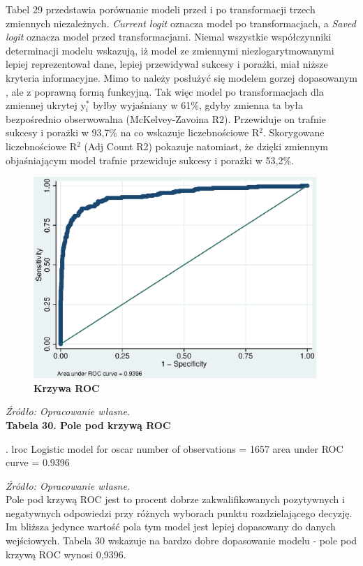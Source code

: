 Tabel 29 przedstawia porównanie modeli przed i po transformacji trzech zmiennych niezależnych. \textit{Current logit} oznacza model po transformacjach, a \textit{Saved logit} oznacza model przed transformacjami. Niemal wszystkie współczynniki determinacji modelu wskazują, iż model ze zmiennymi niezlogarytmowanymi lepiej reprezentował dane, lepiej przewidywał sukcesy i porażki, miał niższe kryteria informacyjne. Mimo to należy posłużyć się modelem gorzej dopasowanym , ale z poprawną formą funkcyjną. Tak więc model po transformacjach dla zmiennej ukrytej y$_{i}^{*}$ byłby wyjaśniany w 61\%, gdyby zmienna ta była bezpośrednio obserwowalna (McKelvey-Zavoina R2). Przewiduje on trafnie sukcesy i porażki w 93,7\% na co wskazuje liczebnościowe R$^{2}$. Skorygowane liczebnościowe R$^{2}$ (Adj Count R2) pokazuje natomiast, że dzięki zmiennym objaśniającym model trafnie przewiduje sukcesy i porażki w 53,2\%.

\begin{figure}[h]
\begin{centering}
  \includegraphics[height=3in]{Rysunki//ROC2}
    \caption{\textbf{Krzywa ROC}}
\end{centering}
\end{figure}
\textit{\footnotesize{Źródło: Opracowanie własne.}} \\

\vspace{0.5cm}
\textbf{Tabela 30. Pole pod krzywą ROC }
\begin{stlog}
. lroc
{\smallskip}
Logistic model for oscar
{\smallskip}
number of observations =     1657
area under ROC curve   =   0.9396 
 \end{stlog}
\textit{\footnotesize{Źródło: Opracowanie własne.}} \\

Pole pod krzywą ROC jest to procent dobrze zakwalifikowanych pozytywnych i negatywnych odpowiedzi przy różnych wyborach punktu rozdzielającego decyzję. Im bliższa jedynce wartość pola tym model jest lepiej dopasowany do danych wejściowych. Tabela 30 wskazuje na bardzo dobre dopasowanie modelu - pole pod krzywą ROC wynosi 0,9396.

